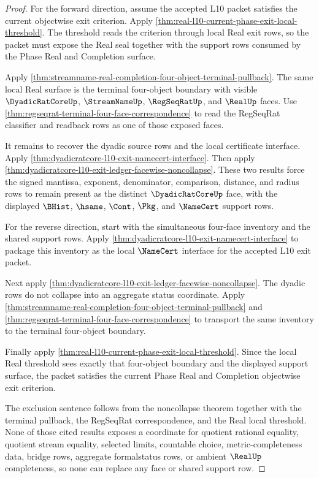 \begin{proof}
For the forward direction, assume the accepted L10 packet satisfies the current objectwise exit criterion. Apply \autoref{thm:real-l10-current-phase-exit-local-threshold}. The threshold reads the criterion through local Real exit rows, so the packet must expose the Real seal together with the support rows consumed by the Phase Real and Completion surface.

Apply \autoref{thm:streamname-real-completion-four-object-terminal-pullback}. The same local Real surface is the terminal four-object boundary with visible $\DyadicRatCoreUp$, $\StreamNameUp$, $\RegSeqRatUp$, and $\RealUp$ faces. Use \autoref{thm:regseqrat-terminal-four-face-correspondence} to read the RegSeqRat classifier and readback rows as one of those exposed faces.

It remains to recover the dyadic source rows and the local certificate interface. Apply \autoref{thm:dyadicratcore-l10-exit-namecert-interface}. Then apply \autoref{thm:dyadicratcore-l10-exit-ledger-facewise-noncollapse}. These two results force the signed mantissa, exponent, denominator, comparison, distance, and radius rows to remain present as the distinct $\DyadicRatCoreUp$ face, with the displayed $\BHist$, $\hsame$, $\Cont$, $\Pkg$, and $\NameCert$ support rows.

For the reverse direction, start with the simultaneous four-face inventory and the shared support rows. Apply \autoref{thm:dyadicratcore-l10-exit-namecert-interface} to package this inventory as the local $\NameCert$ interface for the accepted L10 exit packet.

Next apply \autoref{thm:dyadicratcore-l10-exit-ledger-facewise-noncollapse}. The dyadic rows do not collapse into an aggregate status coordinate. Apply \autoref{thm:streamname-real-completion-four-object-terminal-pullback} and \autoref{thm:regseqrat-terminal-four-face-correspondence} to transport the same inventory to the terminal four-object boundary.

Finally apply \autoref{thm:real-l10-current-phase-exit-local-threshold}. Since the local Real threshold sees exactly that four-object boundary and the displayed support surface, the packet satisfies the current Phase Real and Completion objectwise exit criterion.

The exclusion sentence follows from the noncollapse theorem together with the terminal pullback, the RegSeqRat correspondence, and the Real local threshold. None of those cited results exposes a coordinate for quotient rational equality, quotient stream equality, selected limits, countable choice, metric-completeness data, bridge rows, aggregate formalstatus rows, or ambient $\RealUp$ completeness, so none can replace any face or shared support row.
\end{proof}

